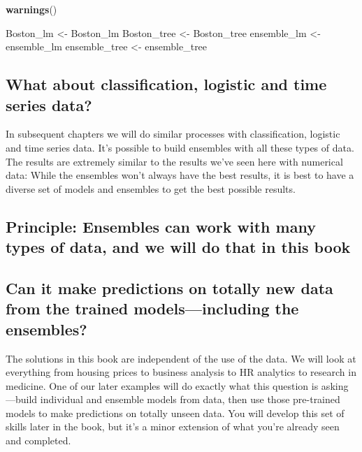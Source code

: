 \documentclass[
]{book}
\newenvironment{Shaded}{\begin{snugshade}}{\end{snugshade}}
\newcommand{\FunctionTok}[1]{\textcolor[rgb]{0.13,0.29,0.53}{\textbf{#1}}}
\newcommand{\NormalTok}[1]{#1}
\newcommand{\OtherTok}[1]{\textcolor[rgb]{0.56,0.35,0.01}{#1}}
\begin{document}
\begin{Shaded}
\begin{Highlighting}[]
\FunctionTok{warnings}\NormalTok{()}
\end{Highlighting}
\end{Shaded}

\begin{Shaded}
\begin{Highlighting}[]

\NormalTok{Boston\_lm }\OtherTok{\textless{}{-}}\NormalTok{ Boston\_lm}
\NormalTok{Boston\_tree }\OtherTok{\textless{}{-}}\NormalTok{ Boston\_tree}
\NormalTok{ensemble\_lm }\OtherTok{\textless{}{-}}\NormalTok{ ensemble\_lm}
\NormalTok{ensemble\_tree }\OtherTok{\textless{}{-}}\NormalTok{ ensemble\_tree}
\end{Highlighting}
\end{Shaded}

\subsection{What about classification, logistic and time series data?}\label{what-about-classification-logistic-and-time-series-data}

In subsequent chapters we will do similar processes with classification,
logistic and time series data. It's possible to build ensembles with all
these types of data. The results are extremely similar to the results
we've seen here with numerical data: While the ensembles won't always
have the best results, it is best to have a diverse set of models and
ensembles to get the best possible results.

\subsection{Principle: Ensembles can work with many types of data, and we will do that in this book}\label{principle-ensembles-can-work-with-many-types-of-data-and-we-will-do-that-in-this-book}

\subsection{Can it make predictions on totally new data from the trained models---including the ensembles?}\label{can-it-make-predictions-on-totally-new-data-from-the-trained-modelsincluding-the-ensembles}

The solutions in this book are independent of the use of the data. We
will look at everything from housing prices to business analysis to HR
analytics to research in medicine. One of our later examples will do
exactly what this question is asking---build individual and ensemble
models from data, then use those pre-trained models to make predictions
on totally unseen data. You will develop this set of skills later in the
book, but it's a minor extension of what you're already seen and
completed.
\end{document}
